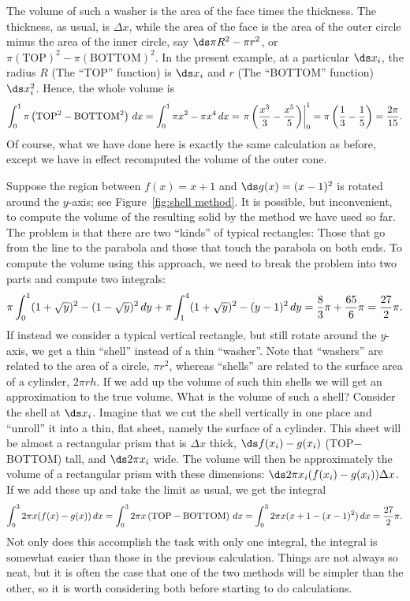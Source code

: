 \begin{solution}
The volume of such a washer is the area of the face times the
thickness. The thickness, as usual, is $\Delta x$, while the area of
the face is the area of the outer circle minus the area of the inner
circle, say $\ds \pi R^2-\pi r^2$, or $\pi(\text{TOP})^2-\pi(\text{BOTTOM})^2$. In the present example, at a particular $\ds x_i$,
the radius $R$ (The ``TOP'' function) is $\ds x_i$ and $r$ (The ``BOTTOM'' function) $\ds x_i^2$. Hence, the whole volume is
$$
  \int_0^1 \pi\left(\text{TOP}^2-\text{BOTTOM}^2\right)\,dx=
  \int_0^1 \pi x^2-\pi x^4\,dx=
  \left.\pi\left({x^3\over3}-{x^5\over5}\right)\right|_0^1=
  \pi\left({1\over3}-{1\over5}\right)={2\pi\over15}.
$$
Of course, what we have done here is exactly the same calculation as
before, except we have in effect recomputed the volume of the outer cone.
\end{solution}

Suppose the region between $f(x)=x+1$ and $\ds g(x)=(x-1)^2$ is rotated around
the $y$-axis; see Figure~\ref{fig:shell method}. It is possible, but
inconvenient, to compute the  volume of the resulting solid by the
method we have used so far. The problem is that there are two
``kinds'' of typical rectangles: Those that go from the line to the
parabola and those that touch the parabola on both ends. To compute
the volume using this approach, we need to break the problem into two
parts and compute two integrals:
$$
  \pi\int_0^1 (1+\sqrt{y})^2-(1-\sqrt{y})^2\,dy+
  \pi\int_1^4  (1+\sqrt{y})^2-(y-1)^2\,dy={8\over3}\pi + {65\over6}\pi
  ={27\over2}\pi.
$$
If instead we consider a typical vertical rectangle, {but still rotate
around the $y$-axis,} we get a thin ``shell'' instead of a thin
``washer''. Note that ``washers'' are related to the area of a circle, $\pi r^2$, whereas ``shells'' are related to the surface area of a cylinder, $2\pi rh$. If we add up the volume of such thin shells we will get an
approximation to the true volume. What is the volume of such a shell?
Consider the shell at $\ds x_i$.
Imagine that we cut the shell vertically in one place and ``unroll''
it into a thin, flat sheet, namely the surface of a cylinder. This sheet will be almost a rectangular
prism that is $\Delta x$ thick, $\ds f(x_i)-g(x_i)$ (TOP$-$BOTTOM) tall, and $\ds 2\pi x_i$
wide. The volume will then be approximately the volume of a rectangular
prism with these dimensions: $\ds 2\pi x_i(f(x_i)-g(x_i))\Delta x$. If we
add these up and take the limit as usual, we get the integral
$$
  \int_0^3 2\pi x(f(x)-g(x))\,dx=
  \int_0^3 2\pi x\left(\text{TOP}-\text{BOTTOM}\right)\,dx=
  \int_0^3 2\pi x(x+1-(x-1)^2)\,dx={27\over2}\pi.
$$
Not only does this accomplish the task with only one integral, the
integral is somewhat easier than those in the previous
calculation. Things are not always so neat, but it is often the case
that one of the two methods will be simpler than the other, so it is
worth considering both before starting to do calculations.

